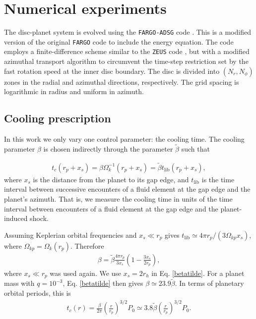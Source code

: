 \section{Numerical experiments}\label{method}
The disc-planet system is evolved using the 
\texttt{FARGO-ADSG} code \citep{baruteau08, baruteau08b}. This is a modified version 
of the original \texttt{FARGO} code \citep{masset00a} to include the energy 
equation. The code employs a finite-difference scheme similar 
to the \texttt{ZEUS} code \citep{stone92}, but with a modified azimuthal transport 
algorithm to circumvent the time-step restriction set by the fast rotation speed at the 
inner disc boundary. 
The disc is divided into $(N_r,N_\phi)$ zones in the radial and azimuthal directions, 
respectively. The grid spacing is logarithmic in radius and uniform in azimuth.

\subsection{Cooling prescription}
In this work we only vary one control parameter: the cooling
time. %
The cooling parameter $\beta$ is chosen indirectly  through the parameter
$\tilde{\beta}$ such that 

\begin{align}
  t_c(r_p+x_s) = \beta\Omega_k^{-1}(r_p+x_s) = \tilde{\beta} t_{\mathrm{lib}}(r_p+x_s), 
\end{align}
where $x_s$ is the distance from the planet to its
gap edge, and $t_\mathrm{lib}$ is the time interval between successive
encounters of a fluid element at the gap edge and the planet's
azimuth. That is, we measure the cooling time in units of the time
interval between encounters of a fluid element at the gap edge and the
planet-induced shock. 

Assuming Keplerian orbital frequencies and $x_s\ll r_p$
gives $t_\mathrm{lib}\simeq 4\pi r_p/(3\Omega_{kp} x_s)$, where
$\Omega_{kp} = \Omega_k(r_p)$. Therefore   
\begin{align}\label{betatilde}
  \beta = \tilde{\beta} \frac{4\pi r_p}{3x_s} \left(1  - \frac{3x_s}{2r_p}\right), 
\end{align}
where $x_s\ll r_p$ was used again. We use $x_s = 2r_h$ in
Eq. \ref{betatilde}. For a planet mass with $q=10^{-3}$,
Eq. \ref{betatilde} then gives $\beta \simeq 23.9\tilde{\beta}$. In
terms of planetary orbital periods, this is
\begin{align} 
  t_c(r) = \frac{\beta}{2\pi}\left(\frac{r}{r_p}\right)^{3/2}P_0\simeq
  3.8 \tilde{\beta}\left(\frac{r}{r_p}\right)^{3/2}P_0. 
\end{align}

